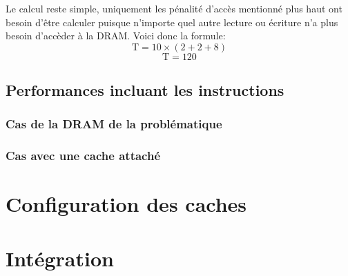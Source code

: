 \documentclass[a11paper]{article}
\begin{document}
Le calcul reste simple, uniquement les pénalité d'accès mentionné plus haut ont besoin d'être calculer puisque n'importe quel autre lecture ou écriture n'a plus besoin d'accèder à
la DRAM. Voici donc la formule:
$$
\text{T} = 10\times(2+2+8)
$$
$$
\text{T} = 120
$$

\subsection{Performances incluant les instructions}
\subsubsection{Cas de la DRAM de la problématique}

\subsubsection{Cas avec une cache attaché}



\section{Configuration des caches}

\section{Intégration}
\end{document}
